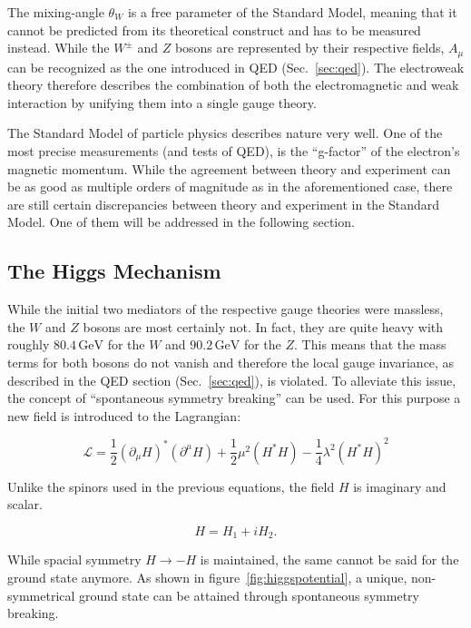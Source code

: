 \noindent The mixing-angle $\theta_W$ is a free parameter of the Standard Model, meaning that it cannot be predicted from its theoretical construct and has to be measured instead. While the $W^\pm$ and $Z$ bosons are represented by their respective fields, $A_\mu$ can be recognized as the one introduced in QED (Sec.~\ref{sec:qed}). The electroweak theory therefore describes the combination of both the electromagnetic and weak interaction by unifying them into a single gauge theory.


The Standard Model of particle physics describes nature very well. One of the most precise measurements (and tests of QED), is the ``g-factor'' of the electron's magnetic momentum. While the agreement between theory and experiment can be as good as multiple orders of magnitude as in the aforementioned case, there are still certain discrepancies between theory and experiment in the Standard Model. One of them will be addressed in the following section.

\subsection{The Higgs Mechanism}
\label{sec:higgs}

While the initial two mediators of the respective gauge theories were massless, the $W$ and $Z$ bosons are most certainly not. In fact, they are quite heavy with roughly $80.4\,\text{GeV}$ for the $W$ and $90.2\,\text{GeV}$ for the $Z$. This means that the mass terms for both bosons do not vanish and therefore the local gauge invariance, as described in the QED section (Sec.~\ref{sec:qed}), is violated. To alleviate this issue, the concept of ``spontaneous symmetry breaking'' can be used. For this purpose a new field is introduced to the Lagrangian:

\begin{equation}
  \label{eq:higgslagrangian}
  \mathcal{L} =  \frac{1}{2} (\partial_\mu H)^* (\partial^\mu H)  + \frac{1}{2} \mu^2 (H^* H) - \frac{1}{4} \lambda^2 (H^* H)^2
\end{equation}

\noindent Unlike the spinors used in the previous equations, the field $H$ is imaginary and scalar.

\begin{equation}
  \label{eq:higgsimfield}
  H = H_1 + i H_2.
\end{equation}

\noindent While spacial symmetry $H \rightarrow - H$ is maintained, the same cannot be said for the ground state anymore. As shown in figure~\ref{fig:higgspotential}, a unique, non-symmetrical ground state can be attained through spontaneous symmetry breaking.


